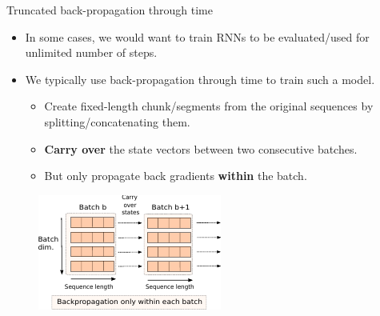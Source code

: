 \begin{frame}{Truncated back-propagation through time}

\begin{itemize}
\item In some cases, we would want to train RNNs to be evaluated/used for unlimited number of steps.
\item We typically use  back-propagation through time to train such a model.
\begin{itemize}
\item Create fixed-length chunk/segments from the original sequences
by splitting/concatenating them.
\item \textbf{Carry over} the state vectors between two consecutive batches.
\item But only propagate back gradients \textbf{within} the batch.
\end{itemize}
\end{itemize}
\begin{figure}
                        \centering
                        \includegraphics[width=.5\linewidth]{./figures/truncated_bptt.pdf}
\end{figure}


\end{frame}



